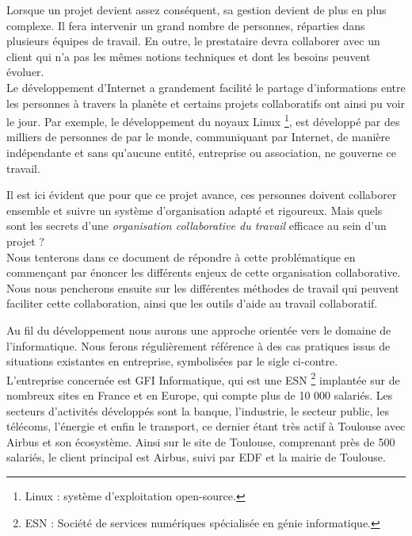 
Lorsque un projet devient assez conséquent, sa gestion devient de plus en plus complexe. Il fera intervenir un grand nombre de personnes, réparties dans plusieurs équipes de travail. En outre, le prestataire devra collaborer avec un client qui n'a pas les mêmes notions techniques et dont les besoins peuvent évoluer.\\

Le développement d'Internet a grandement facilité le partage d'informations entre les personnes à travers la planète et certains projets collaboratifs ont ainsi pu voir le jour. Par exemple, le développement du noyaux Linux \footnote{Linux : système d'exploitation open-source.}, est développé par des milliers de personnes de par le monde, communiquant par Internet, de manière indépendante et sans qu'aucune entité, entreprise ou association, ne gouverne ce travail.

Il est ici évident que pour que ce projet avance, ces personnes doivent collaborer ensemble et suivre un système d'organisation adapté et rigoureux. Mais quels sont les secrets d'une \textit{organisation collaborative du travail} efficace au sein d'un projet ?\\

Nous tenterons dans ce document de répondre à cette problématique en commençant par énoncer les différents enjeux de cette organisation collaborative. Nous nous pencherons ensuite sur les différentes méthodes de travail qui peuvent faciliter cette collaboration, ainsi que les outils d'aide au travail collaboratif.

\begin{app}
Au fil du développement nous aurons une approche orientée vers le domaine de l'informatique. Nous ferons régulièrement référence à des cas pratiques issus de situations existantes en entreprise, symbolisées par le sigle ci-contre.\\

L'entreprise concernée est GFI Informatique, qui est une \gls{ESN} \footnote{ESN : Société de services numériques spécialisée en génie informatique.} implantée sur de nombreux sites en France et en Europe, qui compte plus de 10 000 salariés. Les secteurs d'activités développés sont la banque, l'industrie, le secteur public, les télécoms, l'énergie et enfin le transport, ce dernier étant très actif à Toulouse avec Airbus et son écosystème. Ainsi sur le site de Toulouse, comprenant près de 500 salariés, le client principal est Airbus, suivi par EDF et la mairie de Toulouse.
\end{app}
